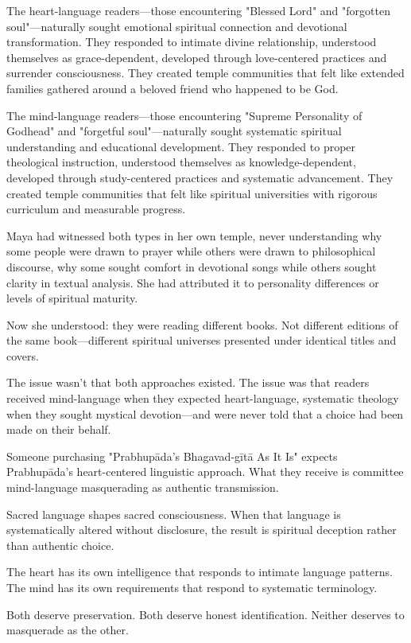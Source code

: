 \documentclass[12pt,twoside]{book}
\begin{document}
The heart-language readers—those encountering "Blessed Lord" and "forgotten soul"—naturally sought emotional spiritual connection and devotional transformation. They responded to intimate divine relationship, understood themselves as grace-dependent, developed through love-centered practices and surrender consciousness. They created temple communities that felt like extended families gathered around a beloved friend who happened to be God.

The mind-language readers—those encountering "Supreme Personality of Godhead" and "forgetful soul"—naturally sought systematic spiritual understanding and educational development. They responded to proper theological instruction, understood themselves as knowledge-dependent, developed through study-centered practices and systematic advancement. They created temple communities that felt like spiritual universities with rigorous curriculum and measurable progress.

Maya had witnessed both types in her own temple, never understanding why some people were drawn to prayer while others were drawn to philosophical discourse, why some sought comfort in devotional songs while others sought clarity in textual analysis. She had attributed it to personality differences or levels of spiritual maturity.

Now she understood: they were reading different books. Not different editions of the same book—different spiritual universes presented under identical titles and covers.

The issue wasn't that both approaches existed. The issue was that readers received mind-language when they expected heart-language, systematic theology when they sought mystical devotion—and were never told that a choice had been made on their behalf.

Someone purchasing "Prabhupāda's Bhagavad-gītā As It Is" expects Prabhupāda's heart-centered linguistic approach. What they receive is committee mind-language masquerading as authentic transmission.

Sacred language shapes sacred consciousness. When that language is systematically altered without disclosure, the result is spiritual deception rather than authentic choice.

The heart has its own intelligence that responds to intimate language patterns. The mind has its own requirements that respond to systematic terminology.

Both deserve preservation. Both deserve honest identification. Neither deserves to masquerade as the other.
\end{document}
